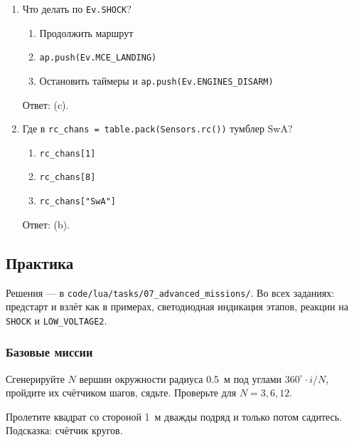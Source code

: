 \begin{enumerate}
    \begin{enumerate}[label=(\alph*)] \item \verb|while true do ap.goToLocalPoint(...) end| \item \verb|Timer.new(0.1, function() ap.goToLocalPoint(...) end)| \item \verb|repeat ... until false| \end{enumerate}
    Ответ: (b).
  \item Что делать по \verb|Ev.SHOCK|?
    \begin{enumerate}[label=(\alph*)] \item Продолжить маршрут \item \verb|ap.push(Ev.MCE_LANDING)| \item Остановить таймеры и \verb|ap.push(Ev.ENGINES_DISARM)| \end{enumerate}
    Ответ: (c).
  \item Где в \verb|rc_chans = table.pack(Sensors.rc())| тумблер SwA?
    \begin{enumerate}[label=(\alph*)] \item \verb|rc_chans[1]| \item \verb|rc_chans[8]| \item \verb|rc_chans["SwA"]| \end{enumerate}
    Ответ: (b).
\end{enumerate}

\subsection{Практика}

Решения --- в \texttt{code/lua/tasks/07\_advanced\_missions/}. Во всех заданиях: предстарт и взлёт как в примерах, светодиодная индикация этапов, реакции на \verb|SHOCK| и \verb|LOW_VOLTAGE2|.

\subsubsection*{Базовые миссии}

\begin{taskbox}
Сгенерируйте $N$ вершин окружности радиуса 0.5~м под углами $360^\circ \cdot i / N$, пройдите их счётчиком шагов, сядьте. Проверьте для $N = 3, 6, 12$.
\end{taskbox}

\begin{taskbox}
Пролетите квадрат со стороной 1~м дважды подряд и только потом садитесь. Подсказка: счётчик кругов.
\end{taskbox}

